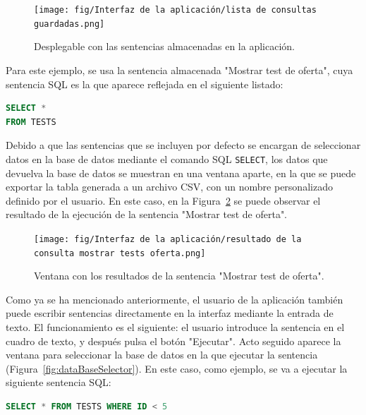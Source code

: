 \begin{figure}[H]
    \centering
    \texttt{[image: fig/Interfaz de la aplicación/lista de consultas guardadas.png]}
    \caption{Desplegable con las sentencias almacenadas en la aplicación.}
    \label{fig:listOfQuerysOnMemory}
\end{figure}

Para este ejemplo, se usa la sentencia almacenada "Mostrar test de oferta", cuya sentencia \acrshort{SQL} es la que aparece reflejada en el siguiente listado:

\begin{lstlisting}[language=SQL,
                   frame=none,
                   numbers=none,
                   basicstyle=\ttfamily\normalsize,
                   caption={sentencia "Mostrar test de oferta"},
                   label=src:queryMostrarTestDeOferta,
                   inputencoding=utf8]                   
SELECT *
FROM TESTS
\end{lstlisting}


 Debido a que las sentencias que se incluyen por defecto se encargan de seleccionar datos en la base de datos mediante el comando \acrshort{SQL} \texttt{SELECT}, los datos que devuelva la base de datos se muestran en una ventana aparte, en la que se puede exportar la tabla generada a un archivo \acrshort{CSV}, con un nombre personalizado definido por el usuario. En este caso, en la Figura~\ref{fig:resultsOfQueryOnMemory} se puede observar el resultado de la ejecución de la sentencia "Mostrar test de oferta".

 \begin{figure}[H]
    \centering
    \texttt{[image: fig/Interfaz de la aplicación/resultado de la consulta mostrar tests oferta.png]}
    \caption{Ventana con los resultados de la sentencia "Mostrar test de oferta".}
    \label{fig:resultsOfQueryOnMemory}
\end{figure}

Como ya se ha mencionado anteriormente, el usuario de la aplicación también puede escribir sentencias directamente en la interfaz mediante la entrada de texto. El funcionamiento es el siguiente: el usuario introduce la sentencia en el cuadro de texto, y después pulsa el botón "Ejecutar". Acto seguido aparece la ventana para seleccionar la base de datos en la que ejecutar la sentencia (Figura~\ref{fig:dataBaseSelector}). En este caso, como ejemplo, se va a ejecutar la siguiente sentencia \acrshort{SQL}:

\begin{lstlisting}[language=SQL,
                   frame=none,
                   numbers=none,
                   basicstyle=\ttfamily\normalsize,
                   caption={Selección de tests con id < 5},
                   label=src:queryTestId<5,
                   inputencoding=utf8]                   
SELECT * FROM TESTS WHERE ID < 5
\end{lstlisting}

